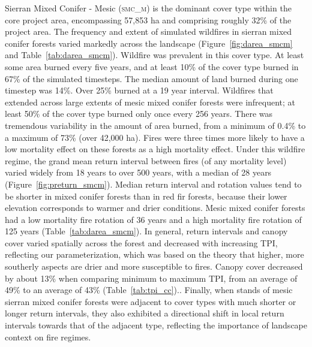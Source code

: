 Sierran Mixed Conifer - Mesic (\textsc{smc\_m}) is the dominant cover type within the core project area, encompassing 57,853 ha and comprising roughly 32\% of the project area. The frequency and extent of simulated wildfires in sierran mixed conifer forests varied markedly across the landscape (Figure~\ref{fig:darea_smcm} and Table~\ref{tab:darea_smcm}). %
%
Wildfire was prevalent in this cover type. At least some area burned every five years, and at least 10\% of the cover type burned in 67\% of the simulated timesteps. The median amount of land burned during one timestep was 14\%. Over 25\% burned at a 19 year interval. Wildfires that extended across large extents of mesic mixed conifer forests were infrequent; at least 50\% of the cover type burned only once every 256 years. There was tremendous variability in the amount of area burned, from a minimum of 0.4\% to a maximum of 73\% (over 42,000 ha). Fires were three times more likely to have a low mortality effect on these forests as a high mortality effect. %
%
Under this wildfire regime, the grand mean return interval between fires (of any mortality level) varied widely from 18 years to over 500 years, with a median of 28 years (Figure~\ref{fig:preturn_smcm}). Median return interval and rotation values tend to be shorter in mixed conifer forests than in red fir forests, because their lower elevation corresponds to warmer and drier conditions. Mesic mixed conifer forests had a low mortality fire rotation of 36 years and a high mortality fire rotation of 125 years (Table~\ref{tab:darea_smcm}).  %
%
In general, return intervals and canopy cover varied spatially across the forest and decreased with increasing TPI, reflecting our parameterization, which was based on the theory that higher, more southerly aspects are drier and more susceptible to fires. Canopy cover decreased by about 13\% when comparing minimum to maximum TPI, from an average of 49\% to an average of 43\% (Table~\ref{tab:tpi_cc})..  %
%
Finally, when stands of mesic sierran mixed conifer forests were adjacent to cover types with much shorter or longer return intervals, they also exhibited a directional shift in local return intervals towards that of the adjacent type, reflecting the importance of landscape context on fire regimes.


